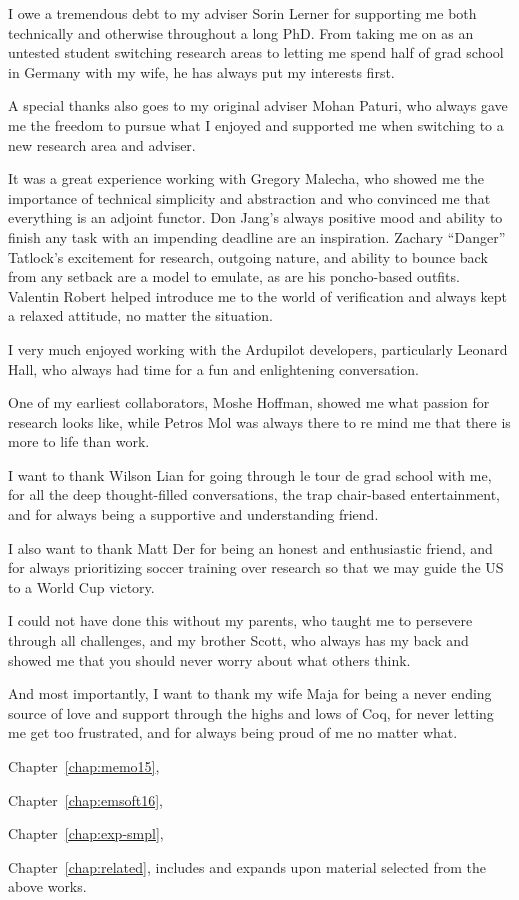 \documentclass[12pt]{ucsddissertation}
\begin{document}
\begin{acknowledgements}
I owe a tremendous debt to my adviser Sorin Lerner for supporting me both
technically and otherwise throughout a long PhD. From taking me on as an
untested student switching research areas to letting me spend half of grad
school in Germany with my wife, he has always put my interests first.

A special thanks also goes to my original adviser Mohan Paturi, who always
gave me the freedom to pursue what I enjoyed and supported me when
switching to a new research area and adviser.

It was a great experience working with Gregory Malecha, who showed me the
importance of technical simplicity and abstraction and who convinced me
that everything is an adjoint functor. Don Jang's always positive mood and
ability to finish any task with an impending deadline are an inspiration.
Zachary ``Danger'' Tatlock's excitement for research, outgoing nature, and
ability to bounce back from any setback are a model to emulate, as are his
poncho-based outfits. Valentin Robert helped introduce me to the world of
verification and always kept a relaxed attitude, no matter the situation.

I very much enjoyed working with the Ardupilot developers, particularly
Leonard Hall, who always had time for a fun and enlightening conversation.

One of my earliest collaborators, Moshe Hoffman, showed me what passion for
research looks like, while Petros Mol was always there to re mind me that
there is more to life than work.

I want to thank Wilson Lian for going through le tour de grad school with
me, for all the deep thought-filled conversations, the trap chair-based
entertainment, and for always being a supportive and understanding friend.

I also want to thank Matt Der for being an honest and enthusiastic friend,
and for always prioritizing soccer training over research so that we may
guide the US to a World Cup victory.

I could not have done this without my parents, who taught me to persevere
through all challenges, and my brother Scott, who always has my back and
showed me that you should never worry about what others think.

And most importantly, I want to thank my wife Maja for being a never ending
source of love and support through the highs and lows of Coq, for never
letting me get too frustrated, and for always being proud of me no matter
what.

Chapter~\ref{chap:memo15}, \memoack{}

Chapter~\ref{chap:emsoft16}, \emsoftack{}

Chapter~\ref{chap:exp-smpl}, \expsmplack{}

Chapter~\ref{chap:related}, includes and expands upon material selected
from the above works.
\end{acknowledgements}
\end{document}
